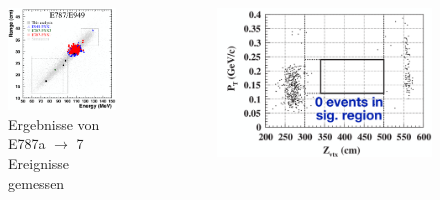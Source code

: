 \documentclass[aspectratio=1610, professionalfonts, 9pt, t]{beamer}
\begin{document}
  \begin{frame}
    \begin{columns}[onlytextwidth]
      \begin{column}{0.5\textwidth}
        \begin{figure}[ht]
          \begin{center}
            \includegraphics[height=0.6\textheight]{Images/e787ergebnis.png} %
            \caption{Ergebnisse von E787a $\rightarrow$ 7 Ereignisse gemessen}
          \end{center}
        \end{figure}
      \end{column}
      \begin{column}{0.5\textwidth}
        \begin{figure}[ht]
          \begin{center}
            \includegraphics[height=0.6\textheight]{Images/e391aergebnis.png} %

\end{center}
\end{figure}
\end{column}
\end{columns}
\end{frame}
\end{document}
